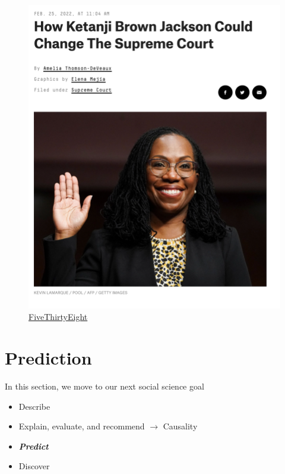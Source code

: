 \documentclass[
  letterpaper,
  DIV=11,
  numbers=noendperiod]{scrreprt}
\providecommand{\tightlist}{%
  \setlength{\itemsep}{0pt}\setlength{\parskip}{0pt}}\usepackage{longtable,booktabs,array}
\begin{document}
\begin{figure}

{\centering \includegraphics{images/sccourtkj.png}

}

\caption{\href{https://fivethirtyeight.com/features/how-ketanji-brown-jackson-could-change-the-supreme-court/}{FiveThirtyEight}}

\end{figure}


\hypertarget{prediction}{%
\chapter{Prediction}\label{prediction}}

In this section, we move to our next social science goal

\begin{itemize}
\tightlist
\item
  Describe
\item
  Explain, evaluate, and recommend \(\rightarrow\) Causality
\item
  \textbf{\emph{Predict}}
\item
  Discover
\end{itemize}
\end{document}
